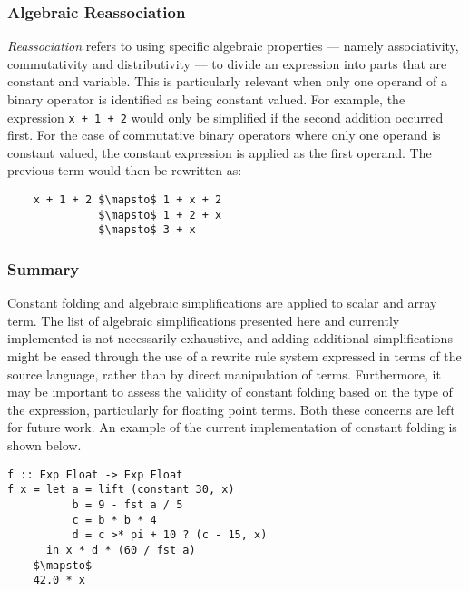 \subsubsection{Algebraic Reassociation}

\emph{Reassociation} refers to using specific algebraic properties --- namely
associativity, commutativity and distributivity --- to divide an expression into
parts that are constant and variable.
This is particularly relevant when only one operand of a binary
operator is identified as being constant valued. For example, the expression
\lstinline{x + 1 + 2} would only be simplified if the second addition occurred
first. For the case of commutative binary operators where only one operand is
constant valued, the constant expression is applied as the first operand. The
previous term would then be rewritten as:
%
\begin{lstlisting}[style=Haskell,numbers=none,mathescape]
%\bf$\langle$ algebraic reassociation $\rangle$%
    x + 1 + 2 $\mapsto$ 1 + x + 2
              $\mapsto$ 1 + 2 + x
              $\mapsto$ 3 + x
\end{lstlisting}


\subsubsection{Summary}

Constant folding and algebraic simplifications are applied to scalar and array
term. The list of algebraic simplifications presented here and currently
implemented is not necessarily exhaustive, and adding additional simplifications
might be eased through the use of a rewrite rule system expressed in terms of
the source language, rather than by direct manipulation of 
terms. Furthermore, it may be important to assess the validity of constant
folding based on the type of the expression, particularly for floating point
terms. Both these concerns are left for future work. An example of the current
implementation of constant folding is shown below.

\begin{lstlisting}[style=Haskell,mathescape,caption={Example of constant expression evaluation}]
f :: Exp Float -> Exp Float
f x = let a = lift (constant 30, x)
          b = 9 - fst a / 5
          c = b * b * 4
          d = c >* pi + 10 ? (c - 15, x)
      in x * d * (60 / fst a)
    $\mapsto$
    42.0 * x
\end{lstlisting}


